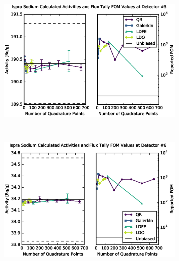 \begin{figure}[!htb]
\ContinuedFloat
\begin{subfigure}{\linewidth}
\centering
\includegraphics[max height=0.445\textheight]
{img/eurac-plots/mcnp/fwc-54.eps}
\label{eurac-54}
\end{subfigure} 
\\
\begin{subfigure}{\linewidth}
\centering
\includegraphics[max height=0.445\textheight]
{img/eurac-plots/mcnp/fwc-64.eps}
\label{eurac-64}
\end{subfigure}
\end{figure}
\clearpage
